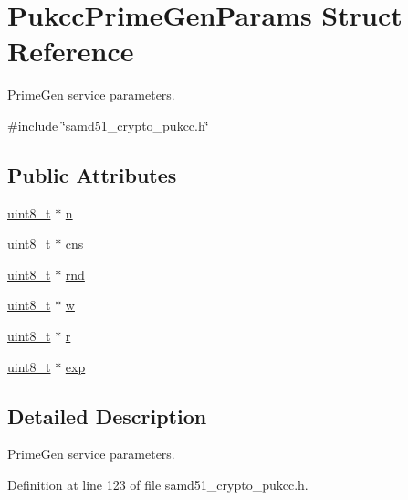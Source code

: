 \hypertarget{structPukccPrimeGenParams}{}\section{Pukcc\+Prime\+Gen\+Params Struct Reference}
\label{structPukccPrimeGenParams}


Prime\+Gen service parameters.  




{\ttfamily \#include \char`\"{}samd51\+\_\+crypto\+\_\+pukcc.\+h\char`\"{}}

\subsection*{Public Attributes}
\begin{DoxyCompactItemize}
\item 
\hyperlink{stdint_8h_aba7bc1797add20fe3efdf37ced1182c5}{uint8\+\_\+t} $\ast$ \hyperlink{structPukccPrimeGenParams_ac685ee671de74cb9c6cd1275060ab60d}{n}
\item 
\hyperlink{stdint_8h_aba7bc1797add20fe3efdf37ced1182c5}{uint8\+\_\+t} $\ast$ \hyperlink{structPukccPrimeGenParams_ae8068e2fe9ab90e9d1088bc3eb6ffdfb}{cns}
\item 
\hyperlink{stdint_8h_aba7bc1797add20fe3efdf37ced1182c5}{uint8\+\_\+t} $\ast$ \hyperlink{structPukccPrimeGenParams_a6fae7226854fe95cfb51611b60d55b60}{rnd}
\item 
\hyperlink{stdint_8h_aba7bc1797add20fe3efdf37ced1182c5}{uint8\+\_\+t} $\ast$ \hyperlink{structPukccPrimeGenParams_adb6b7cd3d710131ee8ad2d5aada6be09}{w}
\item 
\hyperlink{stdint_8h_aba7bc1797add20fe3efdf37ced1182c5}{uint8\+\_\+t} $\ast$ \hyperlink{structPukccPrimeGenParams_a48bb9e985196000ee5acb3dcaf7ab010}{r}
\item 
\hyperlink{stdint_8h_aba7bc1797add20fe3efdf37ced1182c5}{uint8\+\_\+t} $\ast$ \hyperlink{structPukccPrimeGenParams_a6bf437cdac813745c5fd5414238bd761}{exp}
\end{DoxyCompactItemize}


\subsection{Detailed Description}
Prime\+Gen service parameters. 

Definition at line 123 of file samd51\+\_\+crypto\+\_\+pukcc.\+h.




